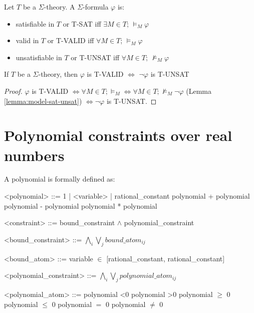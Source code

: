 \begin{definition}
Let $T$ be a $\Sigma$-theory. A $\Sigma$-formula $\varphi$ is:
\begin{itemize}
\item satisfiable in $T$ or T-SAT iff $\exists M \in T$; $\models_{M} \varphi$
\item valid in $T$ or T-VALID iff $\forall M \in T$; $\models_{M} \varphi$
\item unsatisfiable in $T$ or T-UNSAT iff $\forall M \in T$; $\not\models_{M} \varphi$
\end{itemize}
\end{definition}

\begin{lemma} \label{lemma:theory-valid-unsat}
If $T$ be a $\Sigma$-theory, then $\varphi$ is T-VALID $\iff$ $\neg\varphi$ is T-UNSAT
\end{lemma}

\begin{proof}
$\varphi$ is T-VALID $\iff \forall M \in T; \models_{M} \iff \forall M \in T; \not\models_{M} \neg\varphi$ (Lemma \ref{lemma:model-sat-unsat}) $\iff \neg\varphi$ is T-UNSAT.
\end{proof}

\section{Polynomial constraints over real numbers}
A polynomial is formally defined as:
\begin{grammar}
<polynomial> ::= 1 | <variable> | rational\_constant 
				 \alt polynomial + polynomial
			     \alt polynomial - polynomial
			     \alt polynomial * polynomial

<constraint> ::= bound\_constraint $\wedge$ polynomial\_constraint

<bound\_constraint> ::= $\bigwedge\limits_{i} \bigvee\limits_{j} bound\_atom_{ij}$

<bound\_atom> ::= variable $\in$ [rational\_constant, rational\_constant]

<polynomial\_constraint> ::= $\bigwedge\limits_{i} \bigvee\limits_{j} polynomial\_atom_{ij}$

<polynomial\_atom> ::= polynomial \textless 0
					\alt polynomial \textgreater 0
					\alt polynomial $\ge$ 0
					\alt polynomial $\le$ 0
					\alt polynomial $=$ 0
					\alt polynomial $\ne$ 0
\end{grammar}